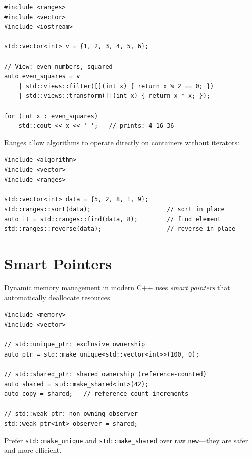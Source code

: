 \documentclass[twoside,12pt]{book}
\theoremstyle{plain}
\theoremstyle{definition}
\theoremstyle{remark}
\begin{document}
\begin{lstlisting}[caption={Range adaptors and views}]
#include <ranges>
#include <vector>
#include <iostream>

std::vector<int> v = {1, 2, 3, 4, 5, 6};

// View: even numbers, squared
auto even_squares = v
    | std::views::filter([](int x) { return x % 2 == 0; })
    | std::views::transform([](int x) { return x * x; });

for (int x : even_squares)
    std::cout << x << ' ';   // prints: 4 16 36
\end{lstlisting}

Ranges allow algorithms to operate directly on containers without
iterators:

\begin{lstlisting}[caption={Ranges algorithms}]
#include <algorithm>
#include <vector>
#include <ranges>

std::vector<int> data = {5, 2, 8, 1, 9};
std::ranges::sort(data);                     // sort in place
auto it = std::ranges::find(data, 8);        // find element
std::ranges::reverse(data);                  // reverse in place
\end{lstlisting}

\section{Smart Pointers}
\label{app:sec:smart-pointers}

Dynamic memory management in modern C++ uses \emph{smart pointers} that
automatically deallocate resources.

\begin{lstlisting}[caption={Smart pointer usage}]
#include <memory>
#include <vector>

// std::unique_ptr: exclusive ownership
auto ptr = std::make_unique<std::vector<int>>(100, 0);

// std::shared_ptr: shared ownership (reference-counted)
auto shared = std::make_shared<int>(42);
auto copy = shared;   // reference count increments

// std::weak_ptr: non-owning observer
std::weak_ptr<int> observer = shared;
\end{lstlisting}

Prefer \texttt{std::make\_unique} and \texttt{std::make\_shared} over
raw \texttt{new}---they are safer and more efficient.
\end{document}
